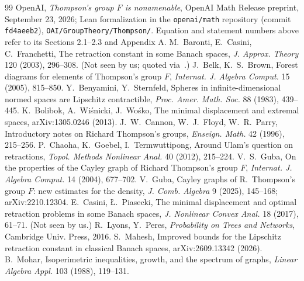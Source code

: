 \documentclass[11pt]{article}
\theoremstyle{definition}
\theoremstyle{remark}
\begin{document}
\begin{thebibliography}{99}
 OpenAI, \emph{Thompson's group $F$ is nonamenable}, OpenAI Math Release preprint,
  September 23, 2026; Lean formalization in the \texttt{openai/math} repository (commit
  \texttt{fd4aeeb2}), \texttt{OAI/GroupTheory/Thompson/}. Equation and statement numbers above
  refer to its Sections 2.1--2.3 and Appendix A.
 M.~Baronti, E.~Casini, C.~Franchetti, The retraction constant in some Banach spaces,
  \emph{J. Approx. Theory} 120 (2003), 296--308. (Not seen by us; quoted via~\cite{CGT,Mahesh}.)
 J.~Belk, K.~S.~Brown, Forest diagrams for elements of Thompson's group $F$,
  \emph{Internat. J. Algebra Comput.} 15 (2005), 815--850.
 Y.~Benyamini, Y.~Sternfeld, Spheres in infinite-dimensional normed spaces are
  Lipschitz contractible, \emph{Proc. Amer. Math. Soc.} 88 (1983), 439--445.
 K.~Bolibok, A.~Wi\'snicki, J.~Wo\'sko, The minimal displacement and extremal spaces,
  arXiv:1305.0246 (2013).
 J.~W.~Cannon, W.~J.~Floyd, W.~R.~Parry, Introductory notes on Richard Thompson's
  groups, \emph{Enseign. Math.} 42 (1996), 215--256.
 P.~Chaoha, K.~Goebel, I.~Termwuttipong, Around Ulam's question on retractions,
  \emph{Topol. Methods Nonlinear Anal.} 40 (2012), 215--224.
 V.~S.~Guba, On the properties of the Cayley graph of Richard Thompson's group
  $F$, \emph{Internat. J. Algebra Comput.} 14 (2004), 677--702.
 V.~Guba, Cayley graphs of R.~Thompson's group $F$: new estimates for the
  density, \emph{J. Comb. Algebra} 9 (2025), 145--168; arXiv:2210.12304.
 E.~Casini, {\L}.~Piasecki, The minimal displacement and optimal retraction problems in some Banach spaces,
  \emph{J. Nonlinear Convex Anal.} 18 (2017), 61--71. (Not seen by us.)
 R.~Lyons, Y.~Peres, \emph{Probability on Trees and Networks}, Cambridge Univ. Press, 2016.
 S.~Mahesh, Improved bounds for the Lipschitz retraction constant in classical
  Banach spaces, arXiv:2609.13342 (2026).
 B.~Mohar, Isoperimetric inequalities, growth, and the spectrum of graphs,
  \emph{Linear Algebra Appl.} 103 (1988), 119--131.
\end{thebibliography}
\end{document}
